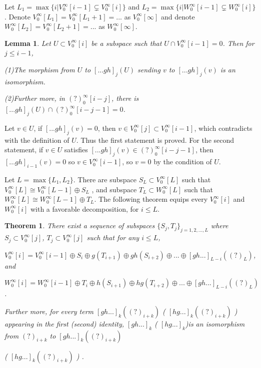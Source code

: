 \def\CTEXPreproc{Created by ctex v0.2.12, don't edit!}\documentclass[11pt]{article}
\newtheorem{thm}{Theorem}[section]
\newtheorem{lem}{Lemma}[section]
\begin{document}
Let $L_1 = \max \{ i| V^{\infty}_0 [i-1]\subsetneq V^{\infty}_0 [i]   \}$ and $L_2 = \max \{ i| W^{\infty}_0 [i-1]\subsetneq W^{\infty}_0 [i]
  \}$. Denote $V^{\infty}_0 [L_1 ]= V^{\infty}_0 [L_1 +1 ] =... $ as $ V^{\infty}_0 [\infty ]  $ and denote  $W^{\infty}_0 [L_2 ]= V^{\infty}_0 [L_2 +1 ] =... $ as $ W^{\infty}_0 [\infty ]  $.

\begin{lem}
Let $U\subset V^{\infty}_0 [i] $ be a subspace such that $U\cap V^{\infty}_0 [i-1] =0 $. Then for $j\leq i-1$,

 \noindent(1)The morphism from $U$ to $[...gh]_j (U) $  sending $v$ to $[...gh]_j (v)  $ is an isomorphism.

 \noindent (2)Further more, in $(?)^{\infty}_0 [i-j]  $, there is $[...gh]_j (U)\cap (?)^{\infty}_0 [i-j-1]=0   $.
\end{lem}

\begin{pf} Let $v\in U$, if $[...gh]_j (v)=0$, then $v\in V^{\infty}_0 [j] \subset V^{\infty}_0 [i-1]$, which contradicts with the definition of $U$. Thus the first statement is proved.  For the second statement, if $v\in U$ satisfies
$[...gh]_j (v)\in (?)^{\infty}_0 [i-j-1] $, then $ [...gh]_{i-1}(v)=0 $ so $v\in V^{\infty}_0 [i-1]$, so $v=0$ by the condition of $U$.\\

\end{pf}

Let $L= \max \{ L_1 ,L_2 \} $. There are subspace $S_{L} \subset V^{\infty}_0 [L ] $ such that
$V^{\infty}_0[L]\cong V^{\infty}_0[L-1] \oplus S_{L}$ , and subspace $T_{L}\subset W^{\infty}_0 [L]  $ such that
$W^{\infty}_0[L]\cong W^{\infty}_0[L-1] \oplus T_{L}$.   The following theorem equips every $V^{\infty}_0 [i] $ and $W^{\infty}_0 [i]$ with
a favorable decomposition, for $i\leq L$.

\begin{thm} There exist a sequence of subspaces $\{ S_j ,T_j  \}_{j=1,2,...,L }$ where $ S_j \subset V^{\infty}_0 [j]  $,
$ T_j \subset V^{\infty}_0 [j] $ such that for any $i\leq L$,

$V^{\infty}_0 [i]= V^{\infty}_0 [i-1]\oplus S_i \oplus g( T_{i+1} ) \oplus gh( S_{i+2} ) \oplus ...\oplus [gh...]_{L-i}(  (?)_L  )  $, and

$W^{\infty}_0 [i]= W^{\infty}_0 [i-1]\oplus T_i \oplus h( S_{i+1} ) \oplus hg( T_{i+2} ) \oplus ...\oplus [gh...]_{L-i}(  (?)_L  )  $ .

Further more, for every term $[gh...]_k ((?)_{i+k})$ ( $[hg...]_k ((?)_{i+k})$  ) appearing in the first (second) identity, $[gh...]_k $ ( $[hg...]_k $)is an isomorphism from $(?)_{i+k}$ to $[gh...]_k ((?)_{i+k})$

\noindent(  $[hg...]_k ((?)_{i+k})$   ) .
\end{thm}
\end{document}
